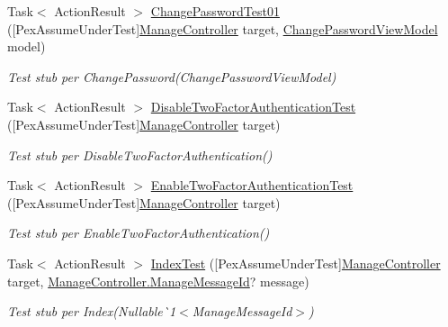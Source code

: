 \begin{DoxyCompactItemize}
Task$<$ Action\+Result $>$ \mbox{\hyperlink{class_brew_day2_1_1_controllers_1_1_tests_1_1_manage_controller_test_ab1ee5ee2dddefa4fd054a4d5cd687881}{Change\+Password\+Test01}} (\mbox{[}Pex\+Assume\+Under\+Test\mbox{]}\mbox{\hyperlink{class_brew_day2_1_1_controllers_1_1_manage_controller}{Manage\+Controller}} target, \mbox{\hyperlink{class_brew_day2_1_1_models_1_1_change_password_view_model}{Change\+Password\+View\+Model}} model)
\begin{DoxyCompactList}\small\item\em Test stub per Change\+Password(\+Change\+Password\+View\+Model)\end{DoxyCompactList}\item 
Task$<$ Action\+Result $>$ \mbox{\hyperlink{class_brew_day2_1_1_controllers_1_1_tests_1_1_manage_controller_test_a95937b1188ebe2fdbe1af37ab02dcb60}{Disable\+Two\+Factor\+Authentication\+Test}} (\mbox{[}Pex\+Assume\+Under\+Test\mbox{]}\mbox{\hyperlink{class_brew_day2_1_1_controllers_1_1_manage_controller}{Manage\+Controller}} target)
\begin{DoxyCompactList}\small\item\em Test stub per Disable\+Two\+Factor\+Authentication()\end{DoxyCompactList}\item 
Task$<$ Action\+Result $>$ \mbox{\hyperlink{class_brew_day2_1_1_controllers_1_1_tests_1_1_manage_controller_test_a9be92c0d9add2d1b1c91e460df584143}{Enable\+Two\+Factor\+Authentication\+Test}} (\mbox{[}Pex\+Assume\+Under\+Test\mbox{]}\mbox{\hyperlink{class_brew_day2_1_1_controllers_1_1_manage_controller}{Manage\+Controller}} target)
\begin{DoxyCompactList}\small\item\em Test stub per Enable\+Two\+Factor\+Authentication()\end{DoxyCompactList}\item 
Task$<$ Action\+Result $>$ \mbox{\hyperlink{class_brew_day2_1_1_controllers_1_1_tests_1_1_manage_controller_test_a94f12aa03abbaee793c5bce33de0f431}{Index\+Test}} (\mbox{[}Pex\+Assume\+Under\+Test\mbox{]}\mbox{\hyperlink{class_brew_day2_1_1_controllers_1_1_manage_controller}{Manage\+Controller}} target, \mbox{\hyperlink{class_brew_day2_1_1_controllers_1_1_manage_controller_a418038dc90e9d94606f474b9c06fd8c8}{Manage\+Controller.\+Manage\+Message\+Id}}? message)
\begin{DoxyCompactList}\small\item\em Test stub per Index(Nullable\`{}1$<$Manage\+Message\+Id$>$)\end{DoxyCompactList}\item 

\end{DoxyCompactItemize}
